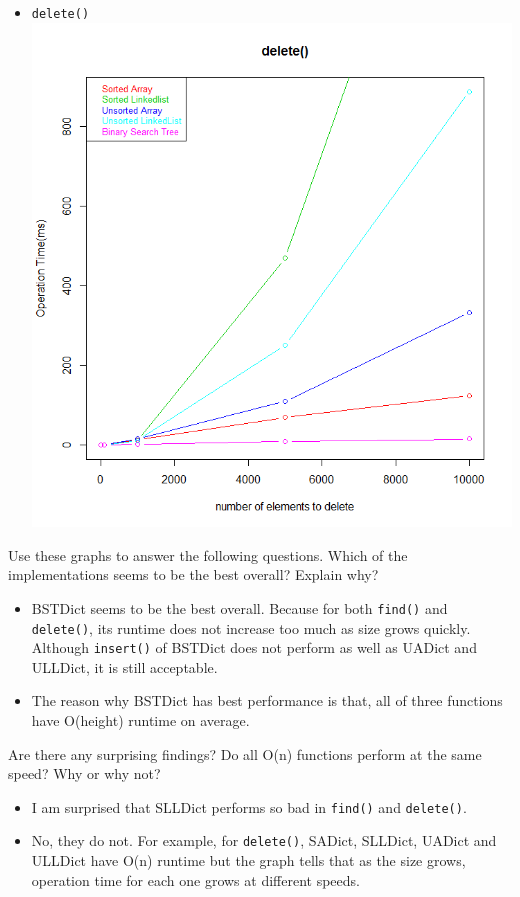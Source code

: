 \documentclass[]{exam}
\begin{document}
\begin{questions}
\begin{itemize}
		\item \verb|delete()|\\
			\includegraphics[scale = 0.5]{delete.png}
	\end{itemize}

	Use these graphs to answer the following questions.
	\question Which of the implementations seems to be the best overall? Explain why?
	\begin{itemize}
		\item BSTDict seems to be the best overall. Because for both \verb|find()| and \verb|delete()|, its runtime does not increase too much as size grows quickly. Although \verb|insert()| of BSTDict does not perform as well as UADict and ULLDict, it is still acceptable. 
		\item The reason why BSTDict has best performance is that, all of three functions have O(height) runtime on average.
	\end{itemize}
	\question Are there any surprising findings? Do all O(n) functions perform at the same speed? Why or why not?
	\begin{itemize}
		\item I am surprised that SLLDict performs so bad in \verb|find()| and \verb|delete()|.
		\item No, they do not. For example, for \verb|delete()|, SADict, SLLDict, UADict and ULLDict have O(n) runtime but the graph tells that as the size grows, operation time for each one grows at different speeds. 
	\end{itemize}



\end{questions}
\end{document}
